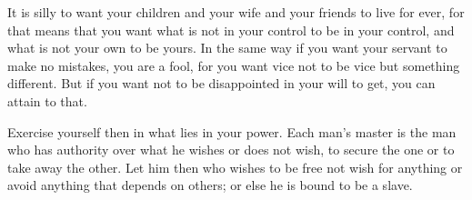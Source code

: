 It is silly  to want your children and  your wife and your friends  to live for
ever, for that  means that you want what  is not in your control to  be in your
control, and what is not your own to be yours. In the same way if you want your
servant to make no  mistakes, you are a fool, for you want  vice not to be vice
but something different. But if you want not to be disappointed in your will to
get, you can attain to that.

Exercise yourself then in what lies in your power. Each man's master is the man
who has authority over what he wishes or does not wish, to secure the one or to
take away the other.  Let him then who wishes to be free  not wish for anything
or avoid anything that depends on others; or else he is bound to be a slave.
